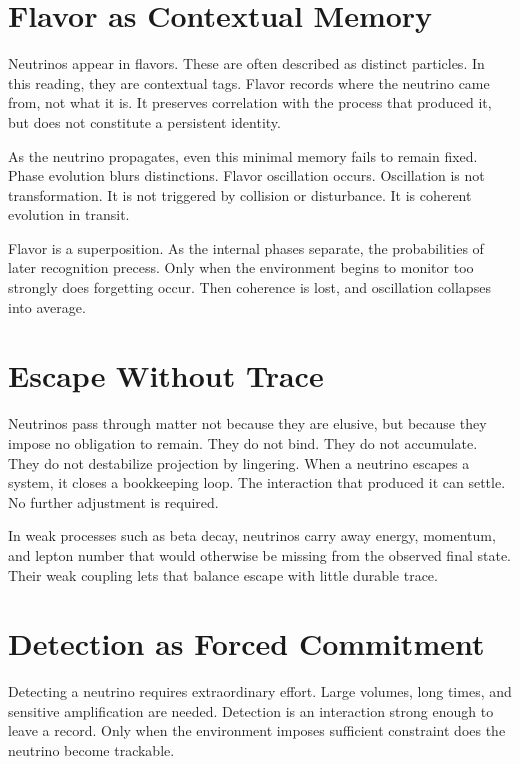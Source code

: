 \documentclass[11pt,twoside,openright]{book}
\begin{document}
\section*{Flavor as Contextual Memory}

Neutrinos appear in flavors. These are often described as distinct particles. In this reading, they are contextual tags. Flavor records where the neutrino came from, not what it is. It preserves correlation with the process that produced it, but does not constitute a persistent identity.

As the neutrino propagates, even this minimal memory fails to remain fixed. Phase evolution blurs distinctions. Flavor oscillation occurs. Oscillation is not transformation. It is not triggered by collision or disturbance. It is coherent evolution in transit.

Flavor is a superposition. As the internal phases separate, the probabilities of later recognition precess. Only when the environment begins to monitor too strongly does forgetting occur. Then coherence is lost, and oscillation collapses into average.

\section*{Escape Without Trace}

Neutrinos pass through matter not because they are elusive, but because they impose no obligation to remain. They do not bind. They do not accumulate. They do not destabilize projection by lingering. When a neutrino escapes a system, it closes a bookkeeping loop. The interaction that produced it can settle. No further adjustment is required.

In weak processes such as beta decay, neutrinos carry away energy, momentum, and lepton number that would otherwise be missing from the observed final state. Their weak coupling lets that balance escape with little durable trace.

\section*{Detection as Forced Commitment}

Detecting a neutrino requires extraordinary effort. Large volumes, long times, and sensitive amplification are needed. Detection is an interaction strong enough to leave a record. Only when the environment imposes sufficient constraint does the neutrino become trackable.
\end{document}
